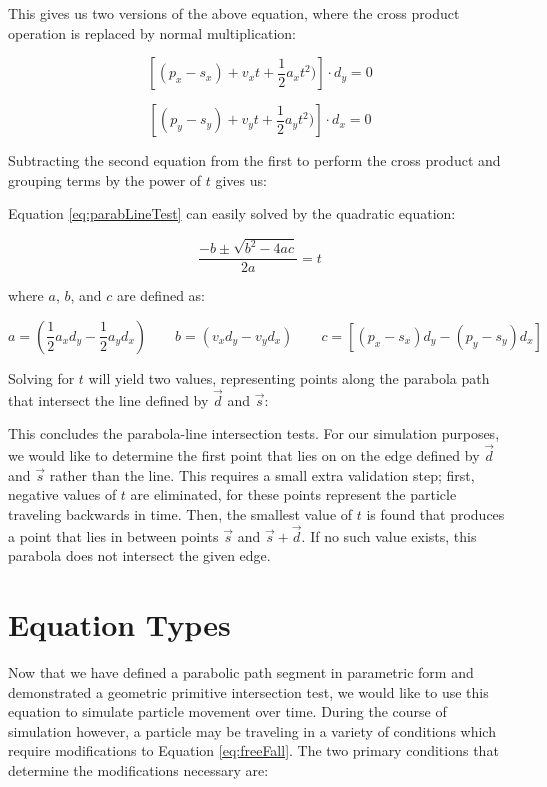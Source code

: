 This gives us two versions of the above equation, where the cross product operation is replaced by normal multiplication:

$$
\left [ (p_x - s_x) + v_x  t + \frac{1}{2} a_x  t^2) \right ] \cdot  d_y = 0
$$

\vspace{0.1in}

$$
\left [ (p_y - s_y) + v_y t + \frac{1}{2} a_y t^2) \right ] \cdot d_x = 0
$$

Subtracting the second equation from the first to perform the cross product and grouping terms by the power of $t$ gives us:


 {
	\label{eq:parabLineTest}
}

Equation \eqref{eq:parabLineTest} can easily solved by the quadratic equation:

$$
	\frac{-b \pm \sqrt{b^2 - 4ac}}{2a} = t
$$

where $a$, $b$, and $c$ are defined as:

$$
a = (\frac{1}{2} a_x d_y - \frac{1}{2} a_y d_x) \qquad b = (v_x d_y - v_y d_x) \qquad c = \left [ (p_x - s_x) d_y - (p_y - s_y) d_x \right ]
$$

Solving for $t$ will yield two values, representing points along the parabola path that intersect the line defined by $\vec{d}$ and $\vec{s}$:


This concludes the parabola-line intersection tests. For our simulation purposes, we would like to determine the first point that lies on on the edge defined by $\vec{d}$ and $\vec{s}$ rather than the line. This requires a small extra validation step; first, negative values of $t$ are eliminated, for these points represent the particle traveling backwards in time. Then, the smallest value of $t$ is found that produces a point that lies in between points $\vec{s}$ and $\vec{s} + \vec{d}$. If no such value exists, this parabola does not intersect the given edge.

\section{Equation Types}

Now that we have defined a parabolic path segment in parametric form and demonstrated a geometric primitive intersection test, we would like to use this equation to simulate particle movement over time. During the course of simulation however, a particle may be traveling in a variety of conditions which require modifications to Equation \eqref{eq:freeFall}. The two primary conditions that determine the modifications necessary are:

